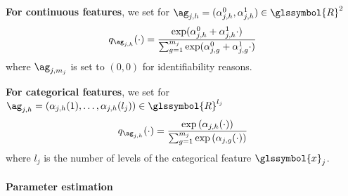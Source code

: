  {\bf For continuous features}, we set for $\ag_{j,h} = (\alpha^0_{j,h},\alpha^1_{j,h}) \in \glssymbol{R}^2$
\begin{equation} \label{eq:softmax}
q_{\ag_{j,h}}(\cdot) = \frac{\exp(\alpha^0_{j,h} + \alpha^1_{j,h}  \cdot)}{\sum_{g=1}^{m_j} \exp(\alpha^0_{j,g} + \alpha^1_{j,g}  \cdot)}
\end{equation}
where $\ag_{j,m_j}$ is set to $(0,0)$ for identifiability reasons.




{\bf For categorical features}, we set for $\ag_{j,h}=\left(\alpha_{j,h}(1),\ldots, \alpha_{j,h}(l_j)\right) \in \glssymbol{R}^{l_j}$
\[q_{\ag_{j,h}}(\cdot) = \frac{\exp\left(\alpha_{j,h}(\cdot)\right)}{\sum_{g=1}^{m_j} \exp\left(\alpha_{j,g}(\cdot)\right)}\]
where $l_j$ is the number of levels of the categorical feature $\glssymbol{x}_j$.

\paragraph{Parameter estimation}

